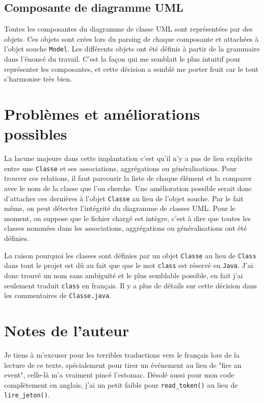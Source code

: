 \documentclass[12pt]{article}
\begin{document}
\subsection{Composante de diagramme UML}
Toutes les composantes du diagramme de classe UML sont représentées par des objets. Ces objets sont crées lors du parsing de chaque composante et attachées à l'objet souche \texttt{Model}. Les différents objets ont été définis à partir de la grammaire dans l'énoncé du travail. C'est la façon qui me semblait le plus intuitif pour représenter les composantes, et cette décision a semblé me porter fruit car le tout s'harmonise très bien.

\section{Problèmes et améliorations possibles}

La lacune majeure dans cette implantation c'est qu'il n'y a pas de lien explicite entre une \texttt{Classe} et ses associations, aggrégations ou généralisations. Pour trouver ces relations, il faut parcourir la liste de chaque élément et la comparer avec le nom de la classe que l'on cherche. Une amélioration possible serait donc d'attacher ces dernières à l'objet \texttt{Classe} au lieu de l'objet souche. Par le fait même, on peut détecter l'intégrité du diagramme de classes UML. Pour le moment, on suppose que le fichier chargé est intègre, c'est à dire que toutes les classes nommées dans les associations, aggrégations ou généralisations ont été définies.

La raison pourquoi les classes sont définies par un objet \texttt{Classe} au lieu de \texttt{Class} dans tout le projet est dû au fait que que le mot \texttt{class} est réservé en \texttt{Java}. J'ai donc trouvé un nom sans ambiguïté et le plus semblable possible, en fait j'ai seulement traduit \texttt{class} en français. Il y a plus de détails sur cette décision dans les commentaires de \texttt{Classe.java}.

\section{Notes de l'auteur}
Je tiens à m'excuser pour les terribles traductions vers le français lors de la lecture de ce texte, spécialement pour tirer un événement au lieu de "fire an event", celle-là m'a vraiment pincé l'estomac.
Désolé aussi pour mon code complètement en anglais, j'ai un petit faible pour \texttt{read\_token()} au lieu de \texttt{lire\_jeton()}.
\end{document}
